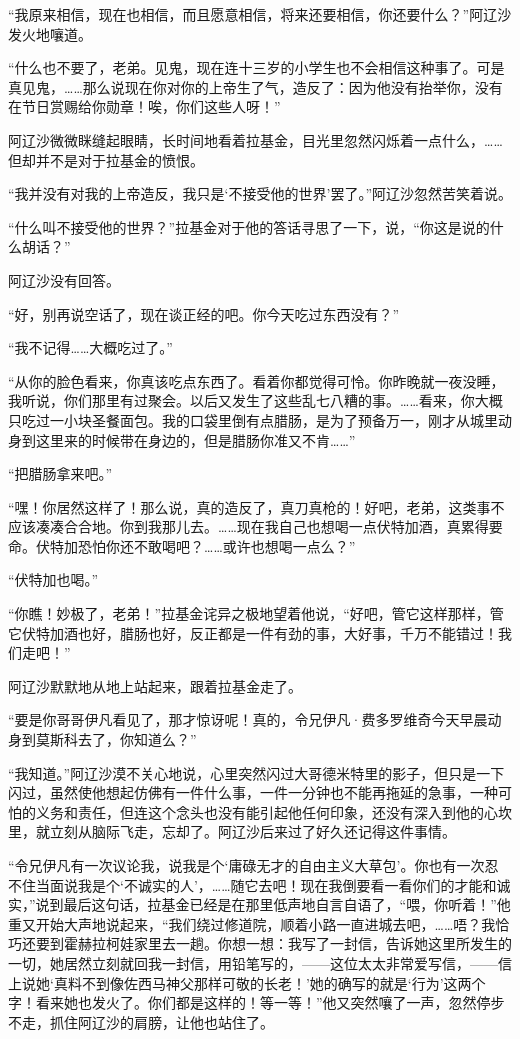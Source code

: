 \par “我原来相信，现在也相信，而且愿意相信，将来还要相信，你还要什么？”阿辽沙发火地嚷道。
\par “什么也不要了，老弟。见鬼，现在连十三岁的小学生也不会相信这种事了。可是真见鬼，……那么说现在你对你的上帝生了气，造反了：因为他没有抬举你，没有在节日赏赐给你勋章！唉，你们这些人呀！”
\par 阿辽沙微微眯缝起眼睛，长时间地看着拉基金，目光里忽然闪烁着一点什么，……但却并不是对于拉基金的愤恨。
\par “我并没有对我的上帝造反，我只是‘不接受他的世界’罢了。”阿辽沙忽然苦笑着说。
\par “什么叫不接受他的世界？”拉基金对于他的答话寻思了一下，说，“你这是说的什么胡话？”
\par 阿辽沙没有回答。
\par “好，别再说空话了，现在谈正经的吧。你今天吃过东西没有？”
\par “我不记得……大概吃过了。”
\par “从你的脸色看来，你真该吃点东西了。看着你都觉得可怜。你昨晚就一夜没睡，我听说，你们那里有过聚会。以后又发生了这些乱七八糟的事。……看来，你大概只吃过一小块圣餐面包。我的口袋里倒有点腊肠，是为了预备万一，刚才从城里动身到这里来的时候带在身边的，但是腊肠你准又不肯……”
\par “把腊肠拿来吧。”
\par “嘿！你居然这样了！那么说，真的造反了，真刀真枪的！好吧，老弟，这类事不应该凑凑合合地。你到我那儿去。……现在我自己也想喝一点伏特加酒，真累得要命。伏特加恐怕你还不敢喝吧？……或许也想喝一点么？”
\par “伏特加也喝。”
\par “你瞧！妙极了，老弟！”拉基金诧异之极地望着他说，“好吧，管它这样那样，管它伏特加酒也好，腊肠也好，反正都是一件有劲的事，大好事，千万不能错过！我们走吧！”
\par 阿辽沙默默地从地上站起来，跟着拉基金走了。
\par “要是你哥哥伊凡看见了，那才惊讶呢！真的，令兄伊凡·费多罗维奇今天早晨动身到莫斯科去了，你知道么？”
\par “我知道。”阿辽沙漠不关心地说，心里突然闪过大哥德米特里的影子，但只是一下闪过，虽然使他想起仿佛有一件什么事，一件一分钟也不能再拖延的急事，一种可怕的义务和责任，但连这个念头也没有能引起他任何印象，还没有深入到他的心坎里，就立刻从脑际飞走，忘却了。阿辽沙后来过了好久还记得这件事情。
\par “令兄伊凡有一次议论我，说我是个‘庸碌无才的自由主义大草包’。你也有一次忍不住当面说我是个‘不诚实的人’，……随它去吧！现在我倒要看一看你们的才能和诚实，”说到最后这句话，拉基金已经是在那里低声地自言自语了，“喂，你听着！”他重又开始大声地说起来，“我们绕过修道院，顺着小路一直进城去吧，……唔？我恰巧还要到霍赫拉柯娃家里去一趟。你想一想：我写了一封信，告诉她这里所发生的一切，她居然立刻就回我一封信，用铅笔写的，——这位太太非常爱写信，——信上说她‘真料不到像佐西马神父那样可敬的长老！’她的确写的就是‘行为’这两个字！看来她也发火了。你们都是这样的！等一等！”他又突然嚷了一声，忽然停步不走，抓住阿辽沙的肩膀，让他也站住了。
